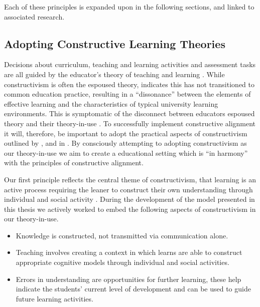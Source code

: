 Each of these principles is expanded upon in the following sections, and linked to associated research.

\subsection{Adopting Constructive Learning Theories } %
\label{sub:ideas_adopted_from_constructivism}

Decisions about curriculum, teaching and learning activities and assessment tasks are all guided by the educator's theory of teaching and learning \cite{Argyris:1976,Ramsden:1992}. While constructivism is often the espoused theory, \citet{Phillips:2005} indicates this has not transitioned to common education practice, resulting in a ``dissonance'' between the elements of effective learning and the characteristics of typical university learning environments. This is symptomatic of the disconnect between educators espoused theory and their theory-in-use \cite{Argyris:1976}. To successfully implement constructive alignment it will, therefore, be important to adopt the practical aspects of constructivism outlined by \citet{Biggs:1996c}, \citet{Biggs:1997} and in \citet{Biggs:2007}. By consciously attempting to adopting constructivism as our theory-in-use we aim to create a educational setting which is ``in harmony'' with the principles of constructive alignment.

Our first principle reflects the central theme of constructivism, that learning is an active process requiring the leaner to construct their own understanding through individual and social activity \cite{Biggs:1996c,Cunningham:1996,Duffy:1992,Glasersfeld:1989,Steffe:1995}. During the development of the model presented in this thesis we actively worked to embed the following aspects of constructivism in our theory-in-use.

\begin{itemize}
	\item Knowledge is constructed, not transmitted via communication alone.
	\item Teaching involves creating a context in which learns are able to construct appropriate cognitive models through individual and social activities.
	\item Errors in understanding are opportunities for further learning, these help indicate the students' current level of development and can be used to guide future learning activities.
\end{itemize}

